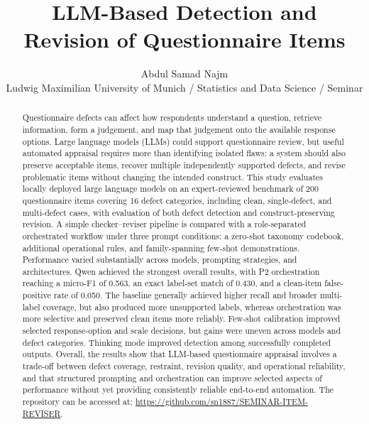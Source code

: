 \documentclass[11pt,a4paper]{article}
\title{
    \large
    LLM-Based Detection and Revision of Questionnaire Items
}
\author{
    Abdul Samad Najm\\
    \small {Ludwig Maximilian University of Munich / Statistics and Data Science / Seminar}
}
\begin{document}
\maketitle



\begin{abstract}
Questionnaire defects can affect how respondents understand a question, retrieve
information, form a judgement, and map that judgement onto the available response
options. Large language models (LLMs) could support questionnaire review, but useful
automated appraisal requires more than identifying isolated flaws: a system should
also preserve acceptable items, recover multiple independently supported defects, and
revise problematic items without changing the intended construct. This study evaluates 
locally deployed large language models on an expert-reviewed
   benchmark of 200 questionnaire items covering 16 defect categories, including clean, 
   single-defect, and multi-defect cases, with evaluation of both defect detection and 
   construct-preserving revision. A simple checker--reviser pipeline is compared with a 
   role-separated orchestrated workflow under three prompt conditions: a zero-shot taxonomy 
   codebook, additional operational rules, and family-spanning few-shot demonstrations. 
   Performance varied substantially across models, prompting strategies, and architectures. 
   Qwen achieved the strongest overall results, with P2 orchestration reaching a micro-F1 of 
   0.563, an exact label-set match of 0.430, and a clean-item false-positive rate of 0.050. 
   The baseline generally achieved higher recall and broader multi-label coverage, but also 
   produced more unsupported labels, whereas orchestration was more selective and preserved 
   clean items more reliably. Few-shot calibration improved selected 
   response-option and scale decisions, but gains were uneven across models and defect categories. 
   Thinking mode improved detection among successfully completed outputs. Overall, the results show 
   that LLM-based questionnaire appraisal involves a trade-off 
   between defect coverage, restraint, revision quality, and operational reliability, and that structured 
   prompting and orchestration can improve selected aspects of performance without yet providing 
   consistently reliable end-to-end automation.
   The repository can be accessed at: \url{https://github.com/sn1887/SEMINAR-ITEM-REVISER}.
\end{abstract}
\end{document}
